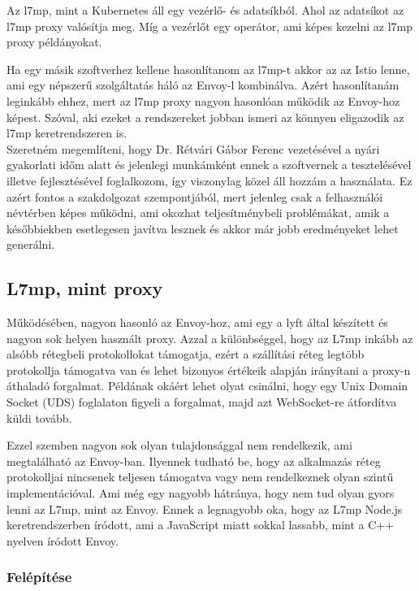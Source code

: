 Az l7mp, mint a Kubernetes áll egy vezérlő- és adatsíkból. Ahol az adatsíkot 
az l7mp proxy valósítja meg. Míg a vezérlőt egy operátor, ami képes kezelni 
az l7mp proxy példányokat. 

Ha egy másik szoftverhez kellene hasonlítanom az l7mp-t akkor az az Istio 
lenne, ami egy népszerű szolgáltatás háló az Envoy-l kombinálva. Azért 
hasonlítanám leginkább ehhez, mert az l7mp proxy nagyon hasonlóan működik az
Envoy-hoz képest. Szóval, aki ezeket a rendszereket jobban ismeri az 
könnyen eligazodik az l7mp keretrendszeren is.\\

Szeretném megemlíteni, hogy Dr. Rétvári Gábor Ferenc vezetésével a nyári
gyakorlati időm alatt és jelenlegi munkámként ennek a szoftvernek a tesztelésével 
illetve fejlesztésével foglalkozom, így viszonylag közel áll hozzám a használata.
Ez azért fontos a szakdolgozat szempontjából, mert jelenleg csak a felhasználói névtérben
képes működni, ami okozhat teljesítménybeli problémákat, amik a későbbiekben 
esetlegesen javítva lesznek és akkor már jobb eredményeket lehet generálni. 

\subsection{L7mp, mint proxy}

Működésében, nagyon hasonló az Envoy-hoz, ami egy a lyft által készített és 
nagyon sok helyen használt proxy. Azzal a különbséggel, hogy az L7mp inkább 
az alsóbb rétegbeli protokollokat támogatja, ezért a szállítási réteg legtöbb 
protokollja támogatva van és lehet bizonyos értékeik alapján irányítani a 
proxy-n áthaladó forgalmat. Példának okáért lehet olyat csinálni, hogy egy
Unix Domain Socket (UDS) foglalaton figyeli a forgalmat, majd azt WebSocket-re
átfordítva küldi tovább. 

Ezzel szemben nagyon sok olyan tulajdonsággal nem rendelkezik, ami megtalálható
az Envoy-ban. Ilyennek tudható be, hogy az alkalmazás réteg protokolljai nincsenek 
teljesen támogatva vagy nem rendelkeznek olyan szintű implementációval. Ami 
még egy nagyobb hátránya, hogy nem tud olyan gyors lenni az L7mp, mint az Envoy.
Ennek a legnagyobb oka, hogy az L7mp Node.js keretrendszerben íródott, ami a 
JavaScript miatt sokkal lassabb, mint a C++ nyelven íródott Envoy.

\subsubsection{Felépítése}

